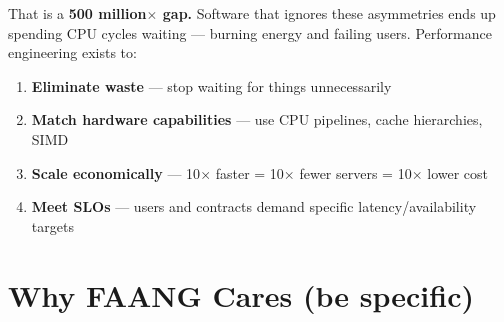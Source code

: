 \documentclass[11pt]{article}
\providecommand{\tightlist}{\setlength{\itemsep}{1pt}\setlength{\parskip}{0pt}}
\begin{document}
That is a \textbf{500 million\(\times\) gap.} Software that ignores these asymmetries ends up spending CPU cycles waiting --- burning energy and failing users. Performance engineering exists to:

\begin{enumerate}
\def\labelenumi{\arabic{enumi}.}
\tightlist
\item
  \textbf{Eliminate waste} --- stop waiting for things unnecessarily
\item
  \textbf{Match hardware capabilities} --- use CPU pipelines, cache hierarchies, SIMD
\item
  \textbf{Scale economically} --- 10\(\times\) faster = 10\(\times\) fewer servers = 10\(\times\) lower cost
\item
  \textbf{Meet SLOs} --- users and contracts demand specific latency/availability targets
\end{enumerate}

\section{Why FAANG Cares (be specific)}\label{why-faang-cares-be-specific}
\end{document}
